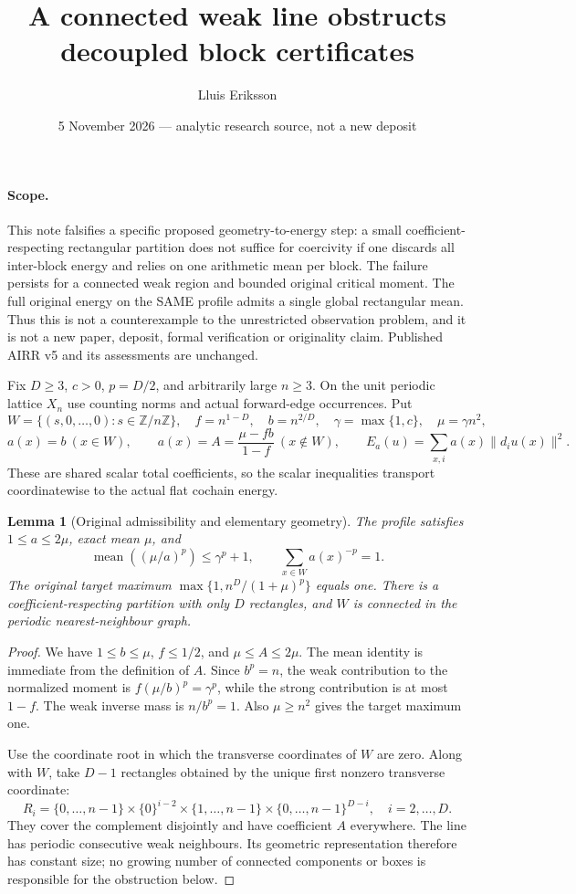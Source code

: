 \documentclass[11pt]{article}
\title{A connected weak line obstructs decoupled block certificates}
\author{Lluis Eriksson}
\date{5 November 2026 --- analytic research source, not a new deposit}
\newtheorem{lemma}{Lemma}
\begin{document}
\maketitle
\paragraph{Scope.}
This note falsifies a specific proposed geometry-to-energy step: a small coefficient-respecting rectangular partition does not suffice for coercivity if one discards all inter-block energy and relies on one arithmetic mean per block. The failure persists for a connected weak region and bounded original critical moment. The full original energy on the SAME profile admits a single global rectangular mean. Thus this is not a counterexample to the unrestricted observation problem, and it is not a new paper, deposit, formal verification or originality claim. Published AIRR v5 and its assessments are unchanged.

Fix $D\ge3$, $c>0$, $p=D/2$, and arbitrarily large $n\ge3$. On the unit periodic lattice $X_n$ use counting norms and actual forward-edge occurrences. Put
\[
 W=\{(s,0,\ldots,0):s\in\mathbb Z/n\mathbb Z\},\quad
 f=n^{1-D},\quad b=n^{2/D},\quad\gamma=\max\{1,c\},\quad\mu=\gamma n^2,
\]
\[
 a(x)=b\ (x\in W),\qquad a(x)=A=\frac{\mu-fb}{1-f}\ (x\notin W),
 \qquad E_a(u)=\sum_{x,i}a(x)\|d_i u(x)\|^2.
\]
These are shared scalar total coefficients, so the scalar inequalities transport coordinatewise to the actual flat cochain energy.

\begin{lemma}[Original admissibility and elementary geometry]\label{lem:profile}
The profile satisfies $1\le a\le2\mu$, exact mean $\mu$, and
\[
 \operatorname{mean}((\mu/a)^p)\le\gamma^p+1,
 \qquad \sum_{x\in W}a(x)^{-p}=1.
\]
The original target maximum $\max\{1,n^D/(1+\mu)^p\}$ equals one. There is a coefficient-respecting partition with only $D$ rectangles, and $W$ is connected in the periodic nearest-neighbour graph.
\end{lemma}
\begin{proof}
We have $1\le b\le\mu$, $f\le1/2$, and $\mu\le A\le2\mu$. The mean identity is immediate from the definition of $A$. Since $b^p=n$, the weak contribution to the normalized moment is
$f(\mu/b)^p=\gamma^p$, while the strong contribution is at most $1-f$. The weak inverse mass is $n/b^p=1$. Also $\mu\ge n^2$ gives the target maximum one.

Use the coordinate root in which the transverse coordinates of $W$ are zero. Along with $W$, take $D-1$ rectangles obtained by the unique first nonzero transverse coordinate:
\[
 R_i=\{0,\ldots,n-1\}\times\{0\}^{i-2}\times\{1,\ldots,n-1\}
 \times\{0,\ldots,n-1\}^{D-i},\quad i=2,\ldots,D.
\]
They cover the complement disjointly and have coefficient $A$ everywhere. The line has periodic consecutive weak neighbours. Its geometric representation therefore has constant size; no growing number of connected components or boxes is responsible for the obstruction below.
\end{proof}
\end{document}
